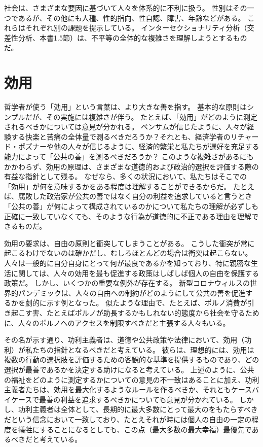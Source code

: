 \documentclass[paper=a4,book,openany]{jlreq}
\begin{document}
社会は、さまざまな要因に基づいて人々を体系的に不利に扱う。
性別はその一つであるが、その他にも人種、性的指向、性自認、障害、年齢などがある。
これらはそれぞれ別の課題を提示している。
インターセクショナリティ分析（交差性分析、本書1.5節）は、不平等の全体的な複雑さを理解しようとするものだ。

\section{効用}

哲学者が使う「効用」という言葉は、より大きな善を指す。
基本的な原則はシンプルだが、その実施には複雑さが伴う。
たとえば、「効用」がどのように測定されるべきかについては意見が分かれる。
ベンサムが信じたように、人々が経験する快楽と苦痛の全体量で測るべきだろうか？それとも、経済学者のリチャード・ポズナーや他の人々が信じるように、経済的繁栄と私たちが選好を充足する能力によって「公共の善」を測るべきだろうか？ このような複雑さがあるにもかかわらず、効用の原理は、さまざまな道徳的および政治的選択を評価する際の有益な指針として残る。
なぜなら、多くの状況において、私たちはそこでの「効用」が何を意味するかをある程度は理解することができるからだ。
たとえば、腐敗した政治家が公共の善ではなく自分の利益を追求していると言うとき「公共の善」が何によって構成されているのかについて私たちの理解が必ずしも正確に一致していなくても、そのような行為が道徳的に不正である理由を理解できるものだ。

効用の要求は、自由の原則と衝突してしまうことがある。
こうした衝突が常に起こるわけでないのは確かだし、むしろほとんどの場合は衝突は起こらない。
人々は一般的に自分自身にとって何が最良であるかを知っており、特に親密な生活に関しては、人々の効用を最も促進する政策はしばしば個人の自由を保護する政策だ。
しかし、いくつかの重要な例外が存在する。
新型コロナウィルスの世界的パンデミックは、人々の自由への制約がどのようにして公共の善を促進するかを劇的に示す例となった。
似たような理由で、たとえば、ポルノ消費が引き起こす害、たとえばポルノが助長するかもしれない的態度から社会を守るために、人々のポルノへのアクセスを制限すべきだと主張する人々もいる。

その名が示す通り、功利主義者は、道徳や公共政策や法律において、効用（功利）が私たちの指針となるべきだと考えている。
彼らは、理想的には、効用は複数の行動の選択肢を評価するための客観的な基準を提供するものであり、どの選択が最善であるかを決定する助けになると考えている。
上述のように、公共の福祉をどのように測定するかについての意見の不一致はあることに加え、功利主義者たちは、効用を最大化するようなルールを作るべきか、それともケースバイケースで最善の利益を追求するべきかについても意見が分かれている。
しかし、功利主義者は全体として、長期的に最大多数にとって最大のをもたらすべきだという信念において一致しており、たとえそれが時には個人の自由の一定の程度を犠牲にすることになるとしても、この点（最大多数の最大幸福）最優先であるべきだと考えている。
\end{document}
